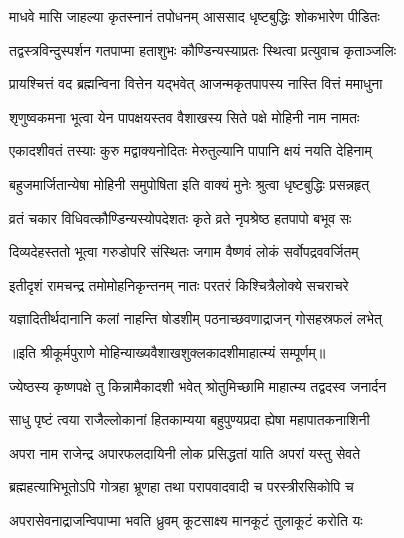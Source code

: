 \twolineshloka
{माधवे मासि जाहल्या कृतस्नानं तपोधनम्}
{आससाद धृष्टबुद्धिः शोकभारेण पीडितः} %

\twolineshloka
{तद्वस्त्रविन्दुस्पर्शन गतपाप्मा हताशुभः}
{कौण्डिन्यस्याप्रतः स्थित्वा प्रत्युवाच कृताञ्जलिः} %


\twolineshloka
{प्रायश्चित्तं वद ब्रह्मन्विना वित्तेन यद्भवेत्}
{आजन्मकृतपापस्य नास्ति वित्तं ममाधुना} %


\twolineshloka
{शृणुष्वकमना भूत्वा येन पापक्षयस्तव}
{वैशाखस्य सिते पक्षे मोहिनी नाम नामतः} %

\twolineshloka
{एकादशीवतं तस्याः कुरु मद्वाक्यनोदितः}
{मेरुतुल्यानि पापानि क्षयं नयति देहिनाम्} %

\twolineshloka
{बहुजमार्जितान्येषा मोहिनी समुपोषिता}
{इति वाक्यं मुनेः श्रुत्वा धृष्टबुद्धिः प्रसन्नहृत्} %

\twolineshloka
{व्रतं चकार विधिवत्कौण्डिन्यस्योपदेशतः}
{कृते व्रते नृपश्रेष्ठ हतपापो बभूव सः} %

\twolineshloka
{दिव्यदेहस्ततो भूत्वा गरुडोपरि संस्थितः}
{जगाम वैष्णवं लोकं सर्वोपद्रववर्जितम्} %

\twolineshloka
{इतीदृशं रामचन्द्र तमोमोहनिकृन्तनम्}
{नातः परतरं किश्चित्रैलोक्ये सचराचरे} %

\twolineshloka
{यज्ञादितीर्थदानानि कलां नाहन्ति षोडशीम्}
{पठनाच्छवणाद्राजन् गोसहस्रफलं लभेत्} %

॥इति श्रीकूर्मपुराणे मोहिन्याख्यवैशाखशुक्लकादशीमाहात्म्यं सम्पूर्णम्॥



\twolineshloka
{ज्येष्ठस्य कृष्णपक्षे तु किन्नामैकादशी भवेत्}
{श्रोतुमिच्छामि माहात्म्य तद्वदस्व जनार्दन} %


\twolineshloka
{साधु पृष्टं त्वया राजैल्लोकानां हितकाम्यया}
{बहुपुण्यप्रदा ह्येषा महापातकनाशिनी} %

\twolineshloka
{अपरा नाम राजेन्द्र अपारफलदायिनी}
{लोक प्रसिद्धतां याति अपरां यस्तु सेवते} %

\twolineshloka
{ब्रह्महत्याभिभूतोऽपि गोत्रहा भ्रूणहा तथा}
{परापवादवादी च परस्त्रीरसिकोपि च} %

\twolineshloka
{अपरासेवनाद्राजन्विपाप्मा भवति ध्रुवम्}
{कूटसाक्ष्य मानकूटं तुलाकूटं करोति यः} %

